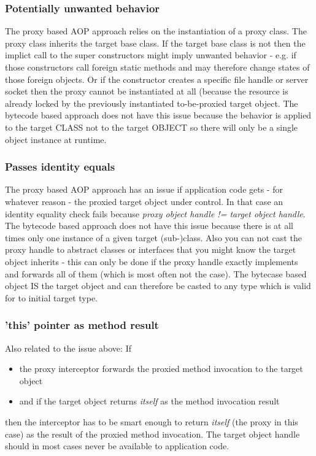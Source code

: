 \subsubsection{Potentially unwanted behavior}
The proxy based AOP approach relies on the instantiation of a proxy class. The proxy class inherits the target base class. If the target base class is not  then the implict call to the super constructors might imply unwanted behavior - e.g. if those constructors call foreign static methods and may therefore change states of those foreign objects. Or if the constructor creates a specific file handle or server socket then the proxy cannot be instantiated at all (because the resource is already locked by the previously instantiated to-be-proxied target object. The bytecode based approach does not have this issue because the behavior is applied to the target CLASS not to the target OBJECT so there will only be a single object instance at runtime.

\subsubsection{Passes identity equals}
The proxy based AOP approach has an issue if application code gets - for whatever reason - the proxied target object under control. In that case an identity equality check fails because \textit{proxy object handle != target object handle}. The bytecode based approach does not have this issue because there is at all times only one instance of a given target (sub-)class. Also you can not cast the proxy handle to abstract classes or interfaces that you might know the target object inherits - this can only be done if the proxy handle exactly implements and forwards all of them (which is most often not the case). The bytecase based object IS the target object and can therefore be casted to any type which is valid for to initial target type.

\subsubsection{'this' pointer as method result}
Also related to the issue above: If
\begin{itemize}
	\item the proxy interceptor forwards the proxied method invocation to the target object
	\item and if the target object returns \textit{itself} as the method invocation result
\end{itemize}
then the interceptor has to be smart enough to return \textit{itself} (the proxy in this case) as the result of the proxied method invocation. The target object handle should in most cases never be available to application code.

